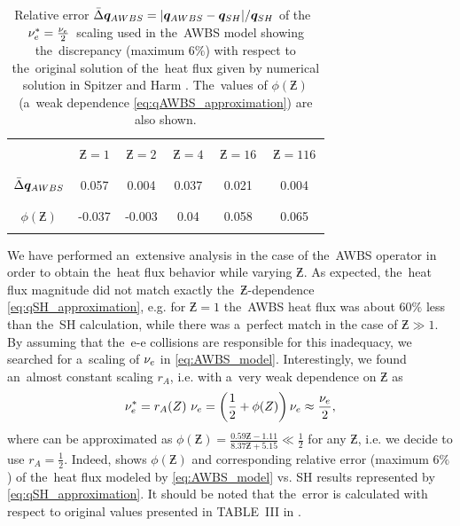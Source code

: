 \begin{table}
\begin{center}
  \begin{tabular}{c|ccccc}
    \hline\hline\\
    & $\,\Zbar=1\,$ & $\,\Zbar=2\,$ & $\,\Zbar=4\,$ & $\,\Zbar=16\,$ & $\,\Zbar=116\,$ \\\\
    \hline\\
    $\bar{\Delta}\boldsymbol{q}_{AWBS}$ & 0.057 & 0.004 & 0.037 & 0.021 & 0.004 \\\\
    \hline\\
    $\phi(\Zbar)$ & -0.037 & -0.003 & 0.04 & 0.058 & 0.065 \\\\ 
    \hline\hline
  \end{tabular}
  \caption{
  Relative error $\bar{\Delta}\boldsymbol{q}_{AWBS} = 
  |\boldsymbol{q}_{AWBS} - \boldsymbol{q}_{SH}| / \boldsymbol{q}_{SH}$ of 
  the~$\nu_{e}^* = \frac{\nu_{e}}{2}$~scaling used in the~AWBS model
   showing the~discrepancy 
  (maximum 6$\%$) with respect to the~original solution of 
  the~heat flux given by numerical solution in Spitzer and Harm 
  \cite{SpitzerHarm_PR1953}. The~values of $\phi(\Zbar)$ (a~weak dependence 
  \eqref{eq:qAWBS_approximation}) are also shown. 
  }
\label{tab:qAWBS}
\end{center}
\end{table}

We have performed an~extensive analysis in the case of 
the~AWBS operator in order to obtain the~heat flux behavior while varying 
$\Zbar$. As expected, the~heat flux magnitude did not match exactly 
the~$\Zbar$-dependence \eqref{eq:qSH_approximation}, e.g. for $\Zbar=1$
the~AWBS heat flux was about 60$\%$ less than the~SH calculation, while
there was a~perfect match in the case of $\Zbar\gg1$. By assuming that the~e-e
collisions are responsible for this inadequacy, we searched for a~scaling of
$\nu_{e}$ in \eqref{eq:AWBS_model}. Interestingly, we found an~almost constant
scaling $ r_A$, i.e. with a~very weak dependence on $\Zbar$ as  
\begin{equation}
  \nu_{e}^* =  r_A(Z)~\nu_{e} 
  = \left(\frac{1}{2} + \phi(Z)\right) \nu_{e} \approx \frac{\nu_{e}}{2} ,
  \label{eq:qAWBS_approximation}
\end{equation}
where can be approximated as 
$\phi(\Zbar) = \frac{0.59 \Zbar - 1.11}{8.37 \Zbar + 5.15} \ll\frac{1}{2}$ 
for any $\Zbar$, i.e. we decide to use $r_A = \frac{1}{2}$.
Indeed,  shows $\phi(\Zbar)$ and corresponding relative
error (maximum 6$\%$) of the~heat flux modeled by 
\eqref{eq:AWBS_model} vs. SH results represented by 
\eqref{eq:qSH_approximation}. It should be noted that the~error is calculated 
with respect to original values presented in TABLE~III in 
\cite{SpitzerHarm_PR1953}.  
 
